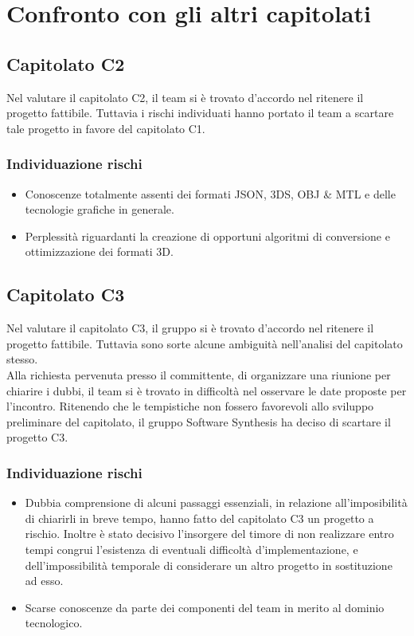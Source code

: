 \section{Confronto con gli altri capitolati}

\subsection{Capitolato C2}
Nel valutare il capitolato C2, il team si è trovato d'accordo nel ritenere il progetto fattibile. Tuttavia i rischi individuati hanno portato il team a scartare tale progetto in favore del capitolato C1.

\subsubsection{Individuazione rischi}
\begin{itemize}
	\item Conoscenze totalmente assenti dei formati JSON, 3DS, OBJ \& MTL e delle tecnologie grafiche in generale.
	\item Perplessità riguardanti la creazione di opportuni algoritmi di conversione e ottimizzazione dei formati 3D.
\end{itemize}

\subsection{Capitolato C3}
Nel valutare il capitolato C3, il gruppo si è trovato d'accordo nel ritenere il progetto fattibile. Tuttavia sono sorte alcune ambiguità nell'analisi del capitolato stesso.\\ Alla richiesta pervenuta presso il committente, di organizzare una riunione per chiarire i dubbi, il team si è trovato in difficoltà nel osservare le date proposte per l'incontro. Ritenendo che le tempistiche non fossero favorevoli allo sviluppo preliminare del capitolato, il gruppo Software Synthesis ha deciso di scartare il progetto C3.

\subsubsection{Individuazione rischi}
\begin{itemize}
	\item Dubbia comprensione di alcuni passaggi essenziali, in relazione all'imposibilità di chiarirli in breve tempo, hanno fatto del capitolato C3 un progetto a rischio. Inoltre è stato decisivo l'insorgere del timore di non realizzare entro tempi congrui l'esistenza di eventuali difficoltà d'implementazione, e dell'impossibilità temporale di considerare un altro progetto in sostituzione ad esso.
	\item Scarse conoscenze da parte dei componenti del team in merito al dominio tecnologico.
\end{itemize}

